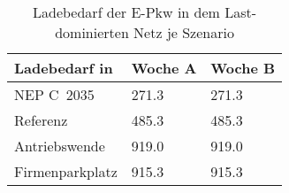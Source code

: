 {
\renewcommand{\arraystretch}{1.2}%
\begin{table}[H]
	\begin{center}
		\caption{Ladebedarf der E-Pkw in dem Last-dominierten Netz je Szenario}
		\begin{tabu} to 0.6\textwidth {X[1.5] X[1, r] X[1, r]}
			\toprule
			Ladebedarf in   \si{\mwh}    & Woche A     & Woche B     \\ \midrule
			NEP C~\num{2035}             & \num{271.3} & \num{271.3} \\
			Referenz                     & \num{485.3} & \num{485.3} \\
			Antriebswende                & \num{919.0} & \num{919.0} \\
			\glqq Firmenparkplatz\grqq{} & \num{915.3} & \num{915.3} \\ \bottomrule
		\end{tabu}
		\label{tab:load_dominated_epkw_demand}
	\end{center}
	\vspace{-3mm}%
\end{table}
}